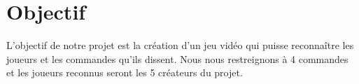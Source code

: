 \section{Objectif}
\label{sec:objectif}

L'objectif de notre projet est la création d'un jeu vidéo qui puisse reconnaître les joueurs et les commandes qu'ils dissent. Nous nous restreignons à 4 commandes et les joueurs reconnus seront les 5 créateurs du projet.